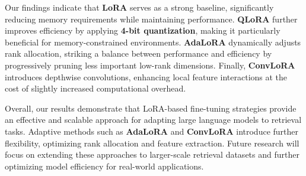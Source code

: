 \documentclass{article}
\begin{document}
Our findings indicate that \textbf{LoRA} serves as a strong baseline, significantly reducing memory requirements while maintaining performance. \textbf{QLoRA} further improves efficiency by applying \textbf{4-bit quantization}, making it particularly beneficial for memory-constrained environments. \textbf{AdaLoRA} dynamically adjusts rank allocation, striking a balance between performance and efficiency by progressively pruning less important low-rank dimensions. Finally, \textbf{ConvLoRA} introduces depthwise convolutions, enhancing local feature interactions at the cost of slightly increased computational overhead.

Overall, our results demonstrate that LoRA-based fine-tuning strategies provide an effective and scalable approach for adapting large language models to retrieval tasks. Adaptive methods such as \textbf{AdaLoRA} and \textbf{ConvLoRA} introduce further flexibility, optimizing rank allocation and feature extraction. Future research will focus on extending these approaches to larger-scale retrieval datasets and further optimizing model efficiency for real-world applications.



  
  
\end{document}
